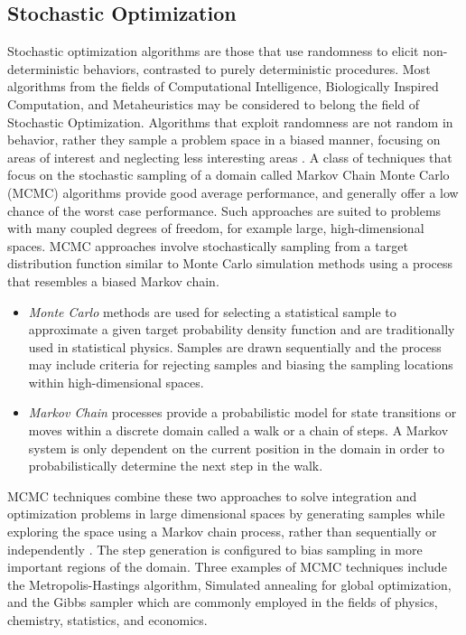 \begin{bibunit}
\subsection{Stochastic Optimization}
\label{subsec:stochastic}
Stochastic optimization algorithms are those that use randomness to elicit non-deterministic behaviors, contrasted to purely deterministic procedures. 
Most algorithms from the fields of Computational Intelligence, Biologically Inspired Computation, and Metaheuristics may be considered to belong the field of Stochastic Optimization. Algorithms that exploit randomness are not random in behavior, rather they sample a problem space in a biased manner, focusing on areas of interest and neglecting less interesting areas \cite{Spall2003}. 
A class of techniques that focus on the stochastic sampling of a domain called Markov Chain Monte Carlo (MCMC) algorithms provide good average performance, and generally offer a low chance of the worst case performance. Such approaches are suited to problems with many coupled degrees of freedom, for example large, high-dimensional spaces. MCMC approaches involve stochastically sampling from a target distribution function similar to Monte Carlo simulation methods using a process that resembles a biased Markov chain.

\begin{itemize}
	\item \emph{Monte Carlo} methods are used for selecting a statistical sample to approximate a given target probability density function and are traditionally used in statistical physics. Samples are drawn sequentially and the process may include criteria for rejecting samples and biasing the sampling locations within high-dimensional spaces. 
	\item \emph{Markov Chain} processes provide a probabilistic model for state transitions or moves within a discrete domain called a walk or a chain of steps. A Markov system is only dependent on the current position in the domain in order to probabilistically determine the next step in the walk.
\end{itemize}

MCMC techniques combine these two approaches to solve integration and optimization problems in large dimensional spaces by generating samples while exploring the space using a Markov chain process, rather than sequentially or independently \cite{Andrieu2003}. The step generation is configured to bias sampling in more important regions of the domain. Three examples of MCMC techniques include the Metropolis-Hastings algorithm, Simulated annealing for global optimization, and the Gibbs sampler which are commonly employed in the fields of physics, chemistry, statistics, and economics. 


\end{bibunit}
